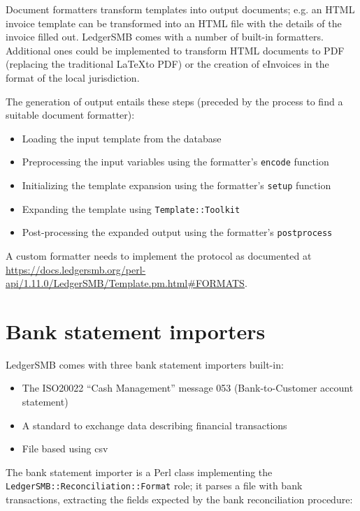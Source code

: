 Document formatters transform templates into output documents; e.g. an HTML invoice
template can be transformed into an HTML file with the details of the invoice filled
out.  LedgerSMB comes with a number of built-in formatters.  Additional ones could be
implemented to transform HTML documents to PDF (replacing the traditional \LaTeX to PDF)
or the creation of eInvoices in the format of the local jurisdiction.

The generation of output entails these steps (preceded by the process to find a
suitable document formatter):

\begin{itemize}
	\item Loading the input template from the database
	\item Preprocessing the input variables using the formatter's \texttt{encode}
		function
	\item Initializing the template expansion using the formatter's \texttt{setup} function
	\item Expanding the template using \texttt{Template::Toolkit}
	\item Post-processing the expanded output using the formatter's \texttt{postprocess}
\end{itemize}

A custom formatter needs to implement the protocol as documented at\\ \url{https://docs.ledgersmb.org/perl-api/1.11.0/LedgerSMB/Template.pm.html#FORMATS}.

\section{Bank statement importers}
\label{sec-customization-bank-importers}

LedgerSMB comes with three bank statement importers built-in:

\begin{itemize}
	\item [CAMT.053] The \gls{ISO20022} ``Cash Management'' message 053
		(Bank-to-Customer account statement)
	\item [\gls{OFX}\index{OFX}] A standard to exchange data describing financial transactions
	\item [CSV]  File based using \gls{csv}
\end{itemize}

The bank statement importer is a Perl class implementing the\\
\texttt{LedgerSMB::Reconciliation::Format} role; it parses a file with bank
transactions, extracting the fields expected by the bank reconciliation procedure:

